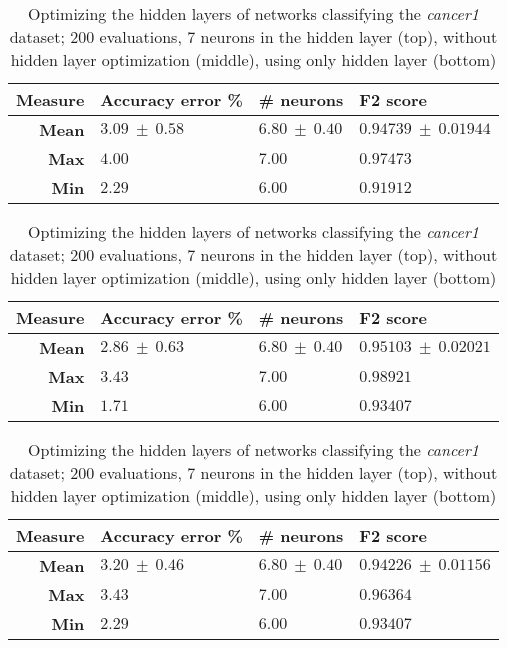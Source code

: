 \documentclass[conference]{IEEEtran}\usepackage[]{graphicx}\usepackage[]{color}
\begin{document}
 \begin{table}
     \centering
     \caption{
Optimizing the hidden layers of networks classifying the \emph{cancer1} dataset; 200 evaluations, 7 neurons in the hidden layer (top), without hidden layer optimization (middle), using only hidden layer (bottom)}
     \label{tab:fixed-7-1-noconst-can1}
     \begin{tabular}{rlll}
         \textbf{Measure}   & \textbf{Accuracy error \%} & \textbf{\# neurons} & \textbf{F2 score} \\
         \hline
         \textbf{Mean}      & $3.09\ \pm\ 0.58$      & $6.80\ \pm\ 0.40$       & $0.94739\ \pm\ 0.01944$ \\
         \textbf{Max}       & $4.00$                 & $7.00$                  & $0.97473$               \\
         \textbf{Min}       & $2.29$                 & $6.00$                  & $0.91912$               \\
     \end{tabular}

     \label{tab:fixed-7-1-const-can1}
     \begin{tabular}{rlll}
        \textbf{Measure}   & \textbf{Accuracy error \%} & \textbf{\# neurons} & \textbf{F2 score} \\
         \hline
         \textbf{Mean}      & $2.86\ \pm\ 0.63$      & $6.80\ \pm\ 0.40$       & $0.95103\ \pm\ 0.02021$ \\
         \textbf{Max}       & $3.43$                 & $7.00$                  & $0.98921$               \\
         \textbf{Min}       & $1.71$                 & $6.00$                  & $0.93407$               \\
     \end{tabular}
 
     \label{tab:fixed-7-1-inicial-can1}
     \begin{tabular}{rlll}
         \textbf{Measure}   & \textbf{Accuracy error \%} & \textbf{\# neurons} & \textbf{F2 score} \\
         \hline
         \textbf{Mean}      & $3.20\ \pm\ 0.46$      & $6.80\ \pm\ 0.40$       & $0.94226\ \pm\ 0.01156$ \\
         \textbf{Max}       & $3.43$                 & $7.00$                  & $0.96364$               \\
         \textbf{Min}       & $2.29$                 & $6.00$                  & $0.93407$               \\
     \end{tabular}
 \end{table}
\end{document}
